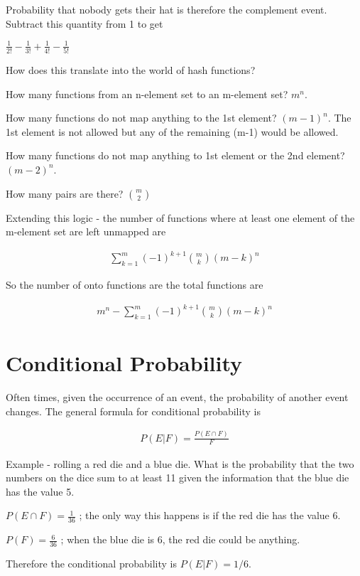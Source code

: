 \documentclass[12pt]{article}
\begin{document}
Probability that nobody gets their hat is therefore the complement event. Subtract this quantity from 1 to get

$\frac{1}{2!} - \frac{1}{3!} + \frac{1}{4!} - \frac{1}{5!}$

\medskip

How does this translate into the world of hash functions?

How many functions from an n-element set to an m-element set? $m^n$.

How many functions do not map anything to the 1st element? $(m-1)^n$. The 1st element is not allowed but any of the remaining (m-1) would be allowed. 

How many functions do not map anything to 1st element or the 2nd element? $(m-2)^n$. 

How many pairs are there? ${m \choose 2}$

Extending this logic - the number of functions where at least one element of the m-element set are left unmapped  are 

\begin{align*}
\sum_{k=1}^m (-1)^{k+1} {m \choose k} (m-k)^n
\end{align*}

So the number of onto functions are the total functions are 

\begin{align*}
m^n - \sum_{k=1}^m (-1)^{k+1} {m \choose k} (m-k)^n
\end{align*}

\section*{Conditional Probability}
Often times, given the occurrence of an event, the probability of another event changes. The general formula for conditional probability is

\begin{align*}
P(E|F) = \frac{P(E \cap F)}{F}
\end{align*}

Example - rolling a red die and a blue die. What is the probability that the two numbers on the dice sum to at least 11 given the information that the blue die has the value 5.

$P(E \cap F) = \frac{1}{36}$ ; the only way this happens is if the red die has the value 6.

$P(F) = \frac{6}{36}$ ; when the blue die is 6, the red die could be anything.

Therefore the conditional probability is $P(E|F) = 1/6$.
\end{document}
